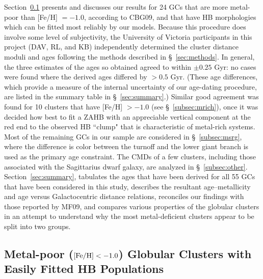 \documentclass[12pt,preprint]{aastex}
\begin{document}
Section~\ref{subsec:std} presents and discusses our results for 24 GCs that are more
metal-poor than [Fe/H] $= -1.0$, according to CBG09, and that have HB
morphologies which can be fitted most reliably by our models.  Because this
procedure does involve some level of subjectivity, the University of Victoria
participants in this project (DAV, RL, and KB) independently determined the
cluster distance moduli and ages following the methods described in
\S~\ref{sec:methods}.  In general, the three
estimates of the ages so obtained agreed to within $\pm
0.25$ Gyr: no cases were found where the derived ages differed by
$> 0.5$ Gyr.  (These age differences, which provide a measure of the internal
uncertainty of our age-dating procedure, are listed in the summary table in
\S~\ref{sec:summary}.)  Similar good agreement was found for 10 clusters
that have [Fe/H] $> -1.0$ (see \S~\ref{subsec:mrich}), once it was decided how
best to fit a ZAHB with an appreciable vertical component at the red end to the
observed HB ``clump" that is characteristic of metal-rich systems.  Most of the
remaining GCs in our sample are considered in \S~\ref{subsec:msrg}, where the
difference is color between the turnoff and the lower giant branch is used as
the primary age constraint.  The CMDs of a few clusters, including those
associated with the Sagittarius dwarf galaxy, are analyzed in 
\S~\ref{subsec:other}.  Section~\ref{sec:summary}, tabulates the ages that have
been derived for all 55 GCs that have been considered in this study, describes
the resultant age--metallicity and age versus Galactocentric distance relations,
reconciles our findings with those  reported by MF09, and compares various
properties of the globular clusters in an attempt to understand why the most
metal-deficient clusters appear to be split into two groups.

\subsection{Metal-poor (${\rm [Fe/H]} < -1.0$) Globular Clusters with Easily
Fitted HB Populations}
\label{subsec:std}
\end{document}
